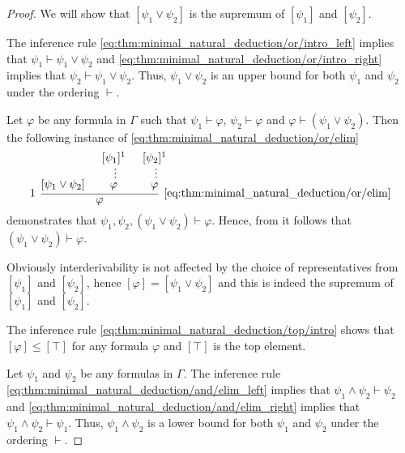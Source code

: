 \begin{proof}
   We will show that \( [\psi_1 \vee \psi_2] \) is the supremum of \( [\psi_1] \) and \( [\psi_2] \).

  The inference rule \eqref{eq:thm:minimal_natural_deduction/or/intro_left} implies that \( \psi_1 \vdash \psi_1 \vee \psi_2 \) and \eqref{eq:thm:minimal_natural_deduction/or/intro_right} implies that \( \psi_2 \vdash \psi_1 \vee \psi_2 \). Thus, \( \psi_1 \vee \psi_2 \) is an upper bound for both \( \psi_1 \) and \( \psi_2 \) under the ordering \( \vdash \).

  Let \( \varphi \) be any formula in \( \Gamma \) such that \( \psi_1 \vdash \varphi \), \( \psi_2 \vdash \varphi \) and \( \varphi \vdash (\psi_1 \vee \psi_2) \). Then the following instance of \eqref{eq:thm:minimal_natural_deduction/or/elim}
  \begin{equation*}
    \begin{prooftree}
      \hypo{ [\psi_1 \vee \psi_2] }
      \hypo{ [\psi_1]^1 }
      \ellipsis {} { \varphi }
      \hypo{ [\psi_2]^1 }
      \ellipsis {} { \varphi }
      \infer[left label=\( 1 \)]3[\ref{eq:thm:minimal_natural_deduction/or/elim}]{ \varphi }
    \end{prooftree}
  \end{equation*}
  demonstrates that \( \psi_1, \psi_2, (\psi_1 \vee \psi_2) \vdash \varphi \). Hence, from  it follows that \( (\psi_1 \vee \psi_2) \vdash \varphi \).

  Obviously interderivability is not affected by the choice of representatives from \( [\psi_1] \) and \( [\psi_2] \), hence \( [\varphi] = [\psi_1 \vee \psi_2] \) and this is indeed the supremum of \( [\psi_1] \) and \( [\psi_2] \).

   The inference rule \eqref{eq:thm:minimal_natural_deduction/top/intro} shows that \( [\varphi] \leq [\top] \) for any formula \( \varphi \) and \( [\top] \) is the top element.

   Let \( \psi_1 \) and \( \psi_2 \) be any formulas in \( \Gamma \). The inference rule \eqref{eq:thm:minimal_natural_deduction/and/elim_left} implies that \( \psi_1 \wedge \psi_2 \vdash \psi_2 \) and \eqref{eq:thm:minimal_natural_deduction/and/elim_right} implies that \( \psi_1 \wedge \psi_2 \vdash \psi_1 \). Thus, \( \psi_1 \wedge \psi_2 \) is a lower bound for both \( \psi_1 \) and \( \psi_2 \) under the ordering \( \vdash \).


\end{proof}
